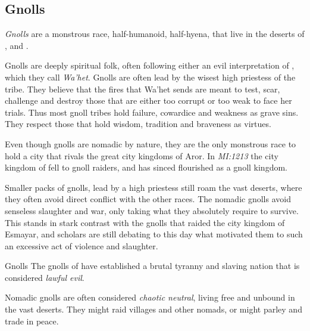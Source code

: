 \subsection{Gnolls}
\label{sec:Gnolls}

\emph{Gnolls} are a monstrous race, half-humanoid, half-hyena, that live in the
deserts of , and .

Gnolls are deeply spiritual folk, often following either an evil interpretation
of , which they call \emph{Wa'het}. Gnolls are often lead by
the wisest high priestess of the tribe. They believe that the fires that Wa'het
sends are meant to test, scar, challenge and destroy those that are either too
corrupt or too weak to face her trials. Thus most gnoll tribes hold failure,
cowardice and weakness as grave sins. They respect those that hold wisdom,
tradition and braveness as virtues.

Even though gnolls are nomadic by nature, they are the only monstrous race to
hold a city that rivals the great city kingdoms of Aror. In \emph{MI:1213} the
city kingdom of  fell to gnoll raiders, and has sinced
flourished as a gnoll kingdom.

Smaller packs of gnolls, lead by a high priestess still roam the vast deserts,
where they often avoid direct conflict with the other races. The nomadic
gnolls avoid senseless slaughter and war, only taking what they absolutely
require to survive. This stands in stark contrast with the gnolls that raided
the city kingdom of Esmayar, and scholars are still debating to this day what
motivated them to such an excessive act of violence and slaughter.

\begin{35e}{Gnolls}
  The gnolls of  have established a brutal tyranny and
  slaving nation that is considered \emph{lawful evil}.

  Nomadic gnolls are often considered \emph{chaotic neutral}, living free and
  unbound in the vast deserts. They might raid villages and other nomads, or
  might parley and trade in peace.
\end{35e}
